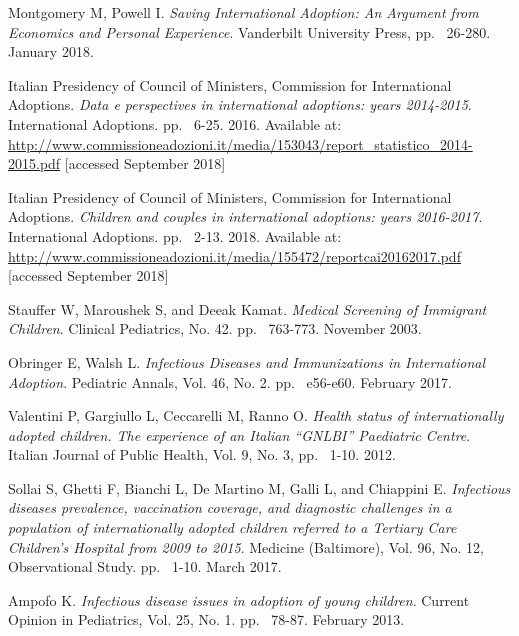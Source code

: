 \begin{thebibliography}{50}
  Montgomery M, Powell I.
  \textit{Saving International Adoption: An Argument from Economics and Personal Experience}.
  Vanderbilt University Press,
  pp. ~26-280.
  January 2018.
  
  Italian Presidency of Council of Ministers, Commission for International Adoptions.
  \textit{Data e perspectives in international adoptions: years 2014-2015}.
  International Adoptions.
  pp. ~6-25.
  2016.
  Available at: \url{http://www.commissioneadozioni.it/media/153043/report_statistico_2014-2015.pdf} [accessed September 2018]  
  
  Italian Presidency of Council of Ministers, Commission for International Adoptions.
  \textit{Children and couples in international adoptions: years 2016-2017}.
  International Adoptions.
  pp. ~2-13.
  2018.
  Available at: \url{http://www.commissioneadozioni.it/media/155472/reportcai20162017.pdf} [accessed September 2018]  
  
  Stauffer W, Maroushek S, and Deeak Kamat.
  \textit{Medical Screening of Immigrant Children}.
  Clinical Pediatrics, No. 42.
  pp. ~763-773.
  November 2003.

  Obringer E, Walsh L.
  \textit{Infectious Diseases and Immunizations in International Adoption}.
  Pediatric Annals, Vol. 46, No. 2.
  pp. ~e56-e60.
  February 2017.

  Valentini P, Gargiullo L, Ceccarelli M, Ranno O.
  \textit{Health status of internationally adopted children. The experience of an Italian “GNLBI” Paediatric Centre}.
  Italian Journal of Public Health, Vol. 9, No. 3,
  pp. ~1-10.
  2012.
  
  Sollai S, Ghetti F, Bianchi L, De Martino M, Galli L, and Chiappini E.
  \textit{Infectious diseases prevalence, vaccination coverage, and diagnostic challenges in a population of internationally adopted children referred to a Tertiary Care Children’s Hospital from 2009 to 2015}.
  Medicine (Baltimore), Vol. 96, No. 12,
  Observational Study.
  pp. ~1-10.
  March 2017.
  
  Ampofo K.
  \textit{Infectious disease issues in adoption of young children}.
  Current Opinion in Pediatrics, Vol. 25, No. 1.
  pp. ~78-87.
  February 2013.


\end{thebibliography}
